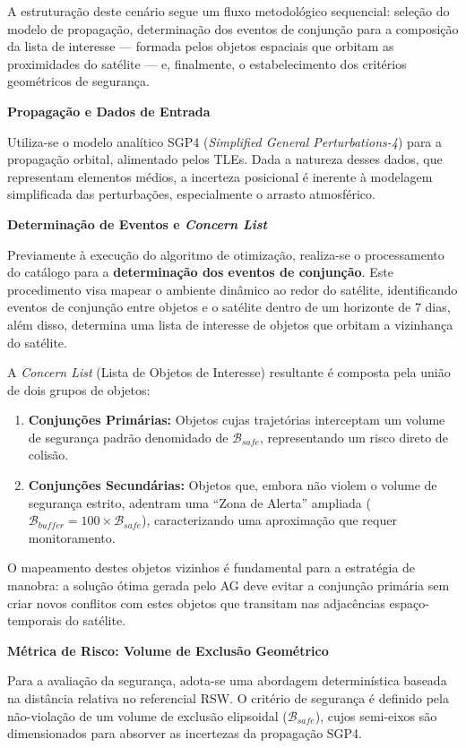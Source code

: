 A estruturação deste cenário segue um fluxo metodológico sequencial: seleção do modelo de propagação, determinação dos eventos de conjunção para a composição da lista de interesse — formada pelos objetos espaciais que orbitam as proximidades do satélite — e, finalmente, o estabelecimento dos critérios geométricos de segurança.

\textbf{Propagação e Dados de Entrada}

Utiliza-se o modelo analítico SGP4 (\textit{Simplified General Perturbations-4}) para a propagação orbital, alimentado pelos TLEs. Dada a natureza desses dados, que representam elementos médios, a incerteza posicional é inerente à modelagem simplificada das perturbações, especialmente o arrasto atmosférico.

\textbf{Determinação de Eventos e \textit{Concern List}}

Previamente à execução do algoritmo de otimização, realiza-se o processamento do catálogo para a \textbf{determinação dos eventos de conjunção}. Este procedimento visa mapear o ambiente dinâmico ao redor do satélite, identificando eventos de conjunção entre objetos e o satélite dentro de um horizonte de 7 dias, além disso, determina uma lista de interesse de objetos que orbitam a vizinhança do satélite.

A \textit{Concern List} (Lista de Objetos de Interesse) resultante é composta pela união de dois grupos de objetos:
\begin{enumerate}
    \item \textbf{Conjunções Primárias:} Objetos cujas trajetórias interceptam um volume de segurança padrão denomidado de $\mathcal{B}_{safe}$, representando um risco direto de colisão.
    \item \textbf{Conjunções Secundárias:} Objetos que, embora não violem o volume de segurança estrito, adentram uma ``Zona de Alerta'' ampliada ($\mathcal{B}_{buffer} = 100 \times \mathcal{B}_{safe}$), caracterizando uma aproximação que requer monitoramento.
\end{enumerate}

O mapeamento destes objetos vizinhos é fundamental para a estratégia de manobra: a solução ótima gerada pelo AG deve evitar a conjunção primária sem criar novos conflitos com estes objetos que transitam nas adjacências espaço-temporais do satélite.

\textbf{Métrica de Risco: Volume de Exclusão Geométrico}

Para a avaliação da segurança, adota-se uma abordagem determinística baseada na distância relativa no referencial RSW. O critério de segurança é definido pela não-violação de um volume de exclusão elipsoidal ($\mathcal{B}_{safe}$), cujos semi-eixos são dimensionados para absorver as incertezas da propagação SGP4.


